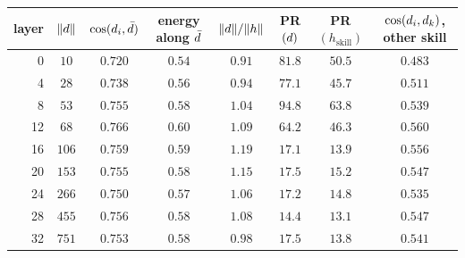 \begin{tabular}{@{}rccccccc@{}}
\toprule
\rowcolor{TableHeader}
layer & $\|d\|$ & $\cos(d_i,\bar{d})$ & energy along $\bar{d}$ & $\|d\|/\|h\|$ & PR$(d)$ & PR$(h_{\text{skill}})$ & $\cos(d_i,d_k)$, other skill \\
\midrule
0 & $10$ & $0.720$ & $0.54$ & $0.91$ & $81.8$ & $50.5$ & $0.483$ \\
4 & $28$ & $0.738$ & $0.56$ & $0.94$ & $77.1$ & $45.7$ & $0.511$ \\
8 & $53$ & $0.755$ & $0.58$ & $1.04$ & $94.8$ & $63.8$ & $0.539$ \\
12 & $68$ & $0.766$ & $0.60$ & $1.09$ & $64.2$ & $46.3$ & $0.560$ \\
16 & $106$ & $0.759$ & $0.59$ & $1.19$ & $17.1$ & $13.9$ & $0.556$ \\
20 & $153$ & $0.755$ & $0.58$ & $1.15$ & $17.5$ & $15.2$ & $0.547$ \\
24 & $266$ & $0.750$ & $0.57$ & $1.06$ & $17.2$ & $14.8$ & $0.535$ \\
28 & $455$ & $0.756$ & $0.58$ & $1.08$ & $14.4$ & $13.1$ & $0.547$ \\
32 & $751$ & $0.753$ & $0.58$ & $0.98$ & $17.5$ & $13.8$ & $0.541$ \\
\bottomrule
\end{tabular}
